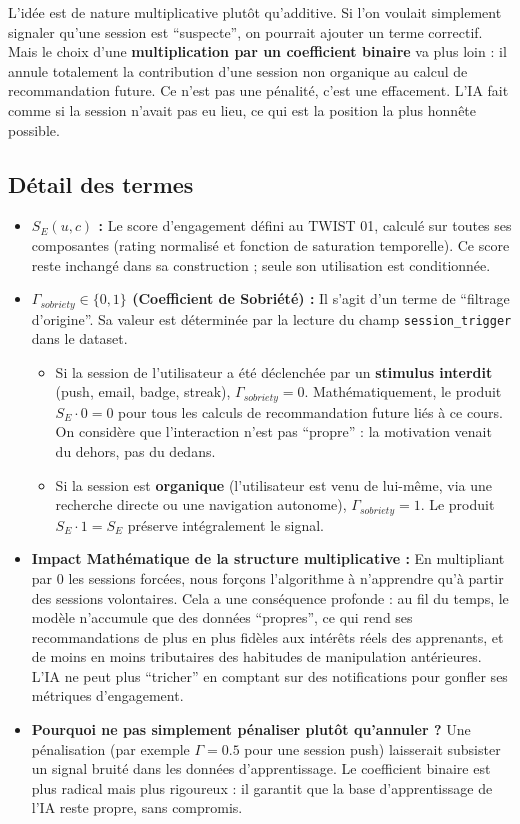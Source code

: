 \documentclass[11pt,a4paper]{article}
\begin{document}
L'idée est de nature multiplicative plutôt qu'additive. Si l'on voulait simplement signaler qu'une session est ``suspecte'', on pourrait ajouter un terme correctif. Mais le choix d'une \textbf{multiplication par un coefficient binaire} va plus loin : il annule totalement la contribution d'une session non organique au calcul de recommandation future. Ce n'est pas une pénalité, c'est une effacement. L'IA fait comme si la session n'avait pas eu lieu, ce qui est la position la plus honnête possible.

\subsection{Détail des termes}
\begin{itemize}
    \item \textbf{$S_E(u, c)$ :} Le score d'engagement défini au TWIST 01, calculé sur toutes ses composantes (rating normalisé et fonction de saturation temporelle). Ce score reste inchangé dans sa construction ; seule son utilisation est conditionnée.

    \item \textbf{$\Gamma_{sobriety} \in \{0, 1\}$ (Coefficient de Sobriété) :}
    Il s'agit d'un terme de ``filtrage d'origine''. Sa valeur est déterminée par la lecture du champ \texttt{session\_trigger} dans le dataset.
    \begin{itemize}
        \item Si la session de l'utilisateur a été déclenchée par un \textbf{stimulus interdit} (push, email, badge, streak), $\Gamma_{sobriety} = 0$. Mathématiquement, le produit $S_E \cdot 0 = 0$ pour tous les calculs de recommandation future liés à ce cours. On considère que l'interaction n'est pas ``propre'' : la motivation venait du dehors, pas du dedans.
        \item Si la session est \textbf{organique} (l'utilisateur est venu de lui-même, via une recherche directe ou une navigation autonome), $\Gamma_{sobriety} = 1$. Le produit $S_E \cdot 1 = S_E$ préserve intégralement le signal.
    \end{itemize}

    \item \textbf{Impact Mathématique de la structure multiplicative :} En multipliant par 0 les sessions forcées, nous forçons l'algorithme à n'apprendre qu'à partir des sessions volontaires. Cela a une conséquence profonde : au fil du temps, le modèle n'accumule que des données ``propres'', ce qui rend ses recommandations de plus en plus fidèles aux intérêts réels des apprenants, et de moins en moins tributaires des habitudes de manipulation antérieures. L'IA ne peut plus ``tricher'' en comptant sur des notifications pour gonfler ses métriques d'engagement.

    \item \textbf{Pourquoi ne pas simplement pénaliser plutôt qu'annuler ?} Une pénalisation (par exemple $\Gamma = 0.5$ pour une session push) laisserait subsister un signal bruité dans les données d'apprentissage. Le coefficient binaire est plus radical mais plus rigoureux : il garantit que la base d'apprentissage de l'IA reste propre, sans compromis.
\end{itemize}
\end{document}
